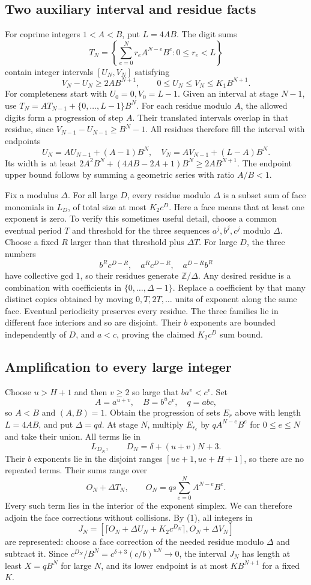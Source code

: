 \subsection*{Two auxiliary interval and residue facts}
For coprime integers $1<A<B$, put $L=4AB$. The digit sums
\[
 T_N=\left\{\sum_{e=0}^N r_e A^{N-e}B^e:0\le r_e<L\right\}
\]
contain integer intervals $[U_N,V_N]$ satisfying
\[
 V_N-U_N\ge2AB^{N+1},\qquad 0\le U_N\le V_N\le K_1B^{N+1}.       \tag{1}
\]
For completeness start with $U_0=0,V_0=L-1$. Given an interval at
stage $N-1$, use $T_N=AT_{N-1}+\{0,\ldots,L-1\}B^N$.
For each residue modulo $A$, the allowed digits form a progression of
step $A$. Their translated intervals overlap in that residue, since
$V_{N-1}-U_{N-1}\ge B^N-1$. All residues therefore fill the interval
with endpoints
\[
 U_N=AU_{N-1}+(A-1)B^N,\quad
 V_N=AV_{N-1}+(L-A)B^N.
\]
Its width is at least $2A^2B^N+(4AB-2A+1)B^N\ge2AB^{N+1}$.
The endpoint upper bound follows by summing a geometric series with
ratio $A/B<1$.

Fix a modulus $\Delta$. For all large $D$, every residue modulo
$\Delta$ is a subset sum of face monomials in $L_D$, of total size at
most $K_2c^D$. Here a face means that at least one exponent is zero.
To verify this sometimes useful detail, choose a common eventual period
$T$ and threshold for the three sequences $a^j,b^j,c^j$ modulo $\Delta$.
Choose a fixed $R$ larger than that threshold plus $\Delta T$. For
large $D$, the three numbers
\[
 b^Rc^{D-R},\quad a^Rc^{D-R},\quad a^{D-R}b^R
\]
have collective gcd $1$, so their residues generate $\mathbb Z/\Delta$.
Any desired residue is a combination with coefficients in
$\{0,\ldots,\Delta-1\}$. Replace a coefficient by that many distinct
copies obtained by moving $0,T,2T,\ldots$ units of exponent along the
same face. Eventual periodicity preserves every residue. The three
families lie in different face interiors and so are disjoint. Their
$b$ exponents are bounded independently of $D$, and $a<c$, proving
the claimed $K_2c^D$ sum bound.

\subsection*{Amplification to every large integer}
Choose $u>H+1$ and then $v\ge2$ so large that $ba^v<c^v$. Set
\[
 A=a^{u+v},\quad B=b^uc^v,\quad q=abc,
\]
so $A<B$ and $(A,B)=1$. Obtain the progression of sets $E_r$ above
with length $L=4AB$, and put $\Delta=qd$. At stage $N$, multiply
$E_{r_e}$ by $qA^{N-e}B^e$ for $0\le e\le N$ and take their union.
All terms lie in
\[
 L_{D_N},\qquad D_N=\delta+(u+v)N+3.
\]
Their $b$ exponents lie in the disjoint ranges
$[ue+1,ue+H+1]$, so there are no repeated terms. Their sums range over
\[
 O_N+\Delta T_N,\qquad O_N=qs\sum_{e=0}^NA^{N-e}B^e.
\]
Every such term lies in the interior of the exponent simplex. We can
therefore adjoin the face corrections without collisions. By (1), all
integers in
\[
 J_N=[\lceil O_N+\Delta U_N+K_2c^{D_N}\rceil,
          O_N+\Delta V_N]
\]
are represented: choose a face correction of the needed residue
modulo $\Delta$ and subtract it. Since
$c^{D_N}/B^N=c^{\delta+3}(c/b)^{uN}\to0$, the interval $J_N$ has
length at least $X=qB^N$ for large $N$, and its lower endpoint is at
most $KB^{N+1}$ for a fixed $K$.

